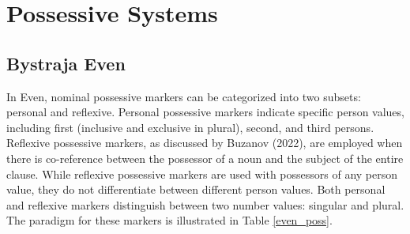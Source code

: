 %
%
%
%
%
%

\section{Possessive Systems}

\label{chapter:possessive_systems}

\subsection{Bystraja Even}

In Even, nominal possessive markers can be categorized into two subsets: personal and reflexive. Personal possessive markers indicate specific person values, including first (inclusive and exclusive in plural), second, and third persons. Reflexive possessive markers, as discussed by Buzanov (2022), are employed when there is co-reference between the possessor of a noun and the subject of the entire clause. While reflexive possessive markers are used with possessors of any person value, they do not differentiate between different person values. Both personal and reflexive markers distinguish between two number values: singular and plural. The paradigm for these markers is illustrated in Table \ref{even_poss}.


